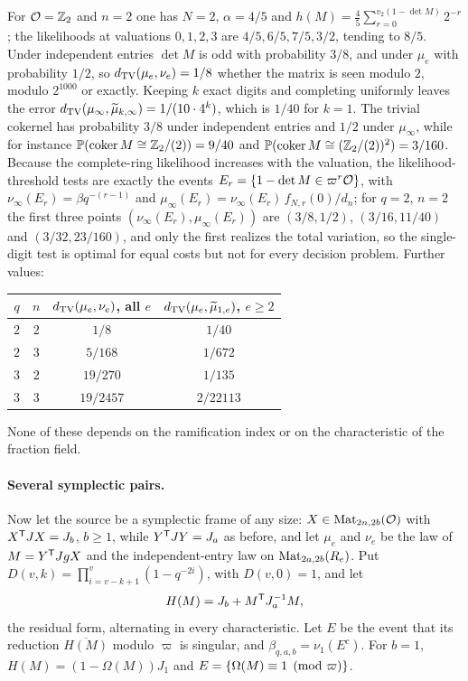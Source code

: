 \begin{example}\label{spn:ex:padic-binary}
For $\mathcal{O}=\mathbb{Z}_2$ and $n=2$ one has $N=2$, $\alpha=4/5$ and
$h(M)=\frac45\sum_{r=0}^{v_2(1-\det M)}2^{-r}$; the likelihoods at valuations $0,1,2,3$ are
$4/5,6/5,7/5,3/2$, tending to $8/5$. Under independent entries $\det M$ is odd with probability
$3/8$, and under $\mu_e$ with probability $1/2$, so $d_{\mathrm{TV}}(\mu_e,\nu_e)=1/8$ whether the matrix is
seen modulo $2$, modulo $2^{1000}$ or exactly. Keeping $k$ exact digits and completing uniformly
leaves the error $d_{\mathrm{TV}}(\mu_\infty,\widetilde\mu_{k,\infty})=1/(10\cdot4^k)$, which is $1/40$ for
$k=1$. The trivial cokernel has probability $3/8$ under independent entries and $1/2$ under
$\mu_\infty$, while for instance $\mathbb{P}(\operatorname{coker} M\cong\mathbb{Z}_2/(2))=9/40$ and
$\mathbb{P}(\operatorname{coker} M\cong(\mathbb{Z}_2/(2))^2)=3/160$. Because the complete-ring likelihood increases with the
valuation, the likelihood-threshold tests are exactly the events
$E_r=\{1-\det M\in\varpi^r\mathcal{O}\}$, with
$\nu_\infty(E_r)=\beta q^{-(r-1)}$ and $\mu_\infty(E_r)=\nu_\infty(E_r)\,f_{N,r}(0)/d_n$; for $q=2$,
$n=2$ the first three points $(\nu_\infty(E_r),\mu_\infty(E_r))$ are $(3/8,1/2)$,
$(3/16,11/40)$ and $(3/32,23/160)$, and only the first realizes the total variation, so the
single-digit test is optimal for equal costs but not for every decision problem. Further values:
\begin{center}\small
\begin{tabular}{cccc}
\toprule
$q$ & $n$ & $d_{\mathrm{TV}}(\mu_e,\nu_e)$, all $e$ & $d_{\mathrm{TV}}(\mu_e,\widetilde\mu_{1,e})$, $e\ge2$\\
\midrule
$2$ & $2$ & $1/8$ & $1/40$\\
$2$ & $3$ & $5/168$ & $1/672$\\
$3$ & $2$ & $19/270$ & $1/135$\\
$3$ & $3$ & $19/2457$ & $2/22113$\\
\bottomrule
\end{tabular}
\end{center}
None of these depends on the ramification index or on the characteristic of the fraction field.
\end{example}

\paragraph{Several symplectic pairs.}
Now let the source be a symplectic frame of any size: $X\in\operatorname{Mat}_{2n,2b}(\mathcal{O})$ with
$X^{\mathsf{T}}JX=J_b$, $b\ge1$, while $Y^{\mathsf{T}}JY=J_a$ as before, and let $\mu_e$ and $\nu_e$ be the law of
$M=Y^{\mathsf{T}}JgX$ and the independent-entry law on $\operatorname{Mat}_{2a,2b}(R_e)$. Put
$D(v,k)=\prod_{i=v-k+1}^{v}(1-q^{-2i})$, with $D(v,0)=1$, and let
\[
 H(M)=J_b+M^{\mathsf{T}}J_a^{-1}M ,
\]
the residual form, alternating in every characteristic. Let $E$ be the event that its reduction
$\overline{H(M)}$ modulo $\varpi$ is singular, and $\beta_{q,a,b}=\nu_1(E^c)$. For $b=1$,
$H(M)=(1-\Omega(M))J_1$ and $E=\{\Omega(M)\equiv1\pmod\varpi\}$.

